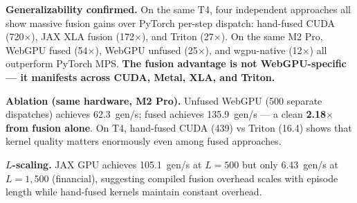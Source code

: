 \documentclass[sigconf,nonacm]{acmart}
\begin{document}
\begin{table}[h]
\caption{Acrobot-v1 (POP=4,096, 163 params, 500 steps, RK4)}
\label{tab:acrobot}
\end{table}

\textbf{Generalizability confirmed.} On the same T4, four independent approaches all show massive fusion gains over PyTorch per-step dispatch: hand-fused CUDA (720$\times$), JAX XLA fusion (172$\times$), and Triton (27$\times$). On the same M2 Pro, WebGPU fused (54$\times$), WebGPU unfused (25$\times$), and wgpu-native (12$\times$) all outperform PyTorch MPS. \textbf{The fusion advantage is not WebGPU-specific --- it manifests across CUDA, Metal, XLA, and Triton.}

\textbf{Ablation (same hardware, M2 Pro).} Unfused WebGPU (500 separate dispatches) achieves 62.3~gen/s; fused achieves 135.9~gen/s --- a clean \textbf{2.18$\times$ from fusion alone}. On T4, hand-fused CUDA (439) vs Triton (16.4) shows that kernel quality matters enormously even among fused approaches.

\textbf{$L$-scaling.} JAX GPU achieves 105.1~gen/s at $L=500$ but only 6.43~gen/s at $L=1{,}500$ (financial), suggesting compiled fusion overhead scales with episode length while hand-fused kernels maintain constant overhead.
\end{document}

